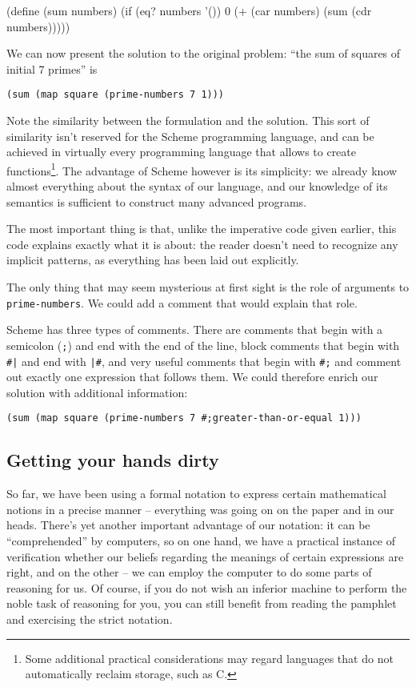 \begin{Snippet}
(define (sum numbers)
  (if (eq? numbers '())
    0
    (+ (car numbers) (sum (cdr numbers)))))
\end{Snippet}

We can now present the solution to the original problem: ``the sum
of squares of initial 7 primes'' is

\texttt{(sum (map square (prime-numbers 7 1)))}

Note the similarity between the formulation and the solution. This
sort of similarity isn't reserved for the Scheme programming language,
and can be achieved in virtually every programming language that
allows to create functions\footnote{Some additional practical
considerations may regard languages that do not automatically reclaim
storage, such as C.}. The advantage of Scheme however is its
simplicity:
we already know almost everything about the syntax of our language,
and our knowledge of its semantics is sufficient to construct many
advanced programs.

The most important thing is that, unlike the imperative code
given earlier, this code explains exactly what it is about: the
reader doesn't need to recognize any implicit patterns, as
everything has been laid out explicitly.

The only thing that may seem mysterious at first sight is the
role of arguments to \texttt{prime-numbers}. We could add a comment
that would explain that role.

Scheme has three types of comments. There are comments that begin
with a semicolon (\texttt{;}) and end with the end of the line,
block comments that begin with \texttt{\#|} and end with \texttt{|\#},
and very useful comments that begin with \texttt{\#;} and comment out
exactly one expression that follows them. We could therefore
enrich our solution with additional information:

\texttt{(sum (map square (prime-numbers 7 \#;greater-than-or-equal 1)))}

\subsection{Getting your hands dirty}

So far, we have been using a formal notation to express certain
mathematical notions in a precise manner -- everything was going
on on the paper and in our heads. There's yet another important
advantage of our notation: it can be ``comprehended'' by computers,
so on one hand, we have a practical instance of verification whether
our beliefs regarding the meanings of certain expressions are right,
and on the other -- we can employ the computer to do some parts
of reasoning for us. Of course, if you do not wish an inferior machine
to perform the noble task of reasoning for you, you can still
benefit from reading the pamphlet and exercising the strict notation.

